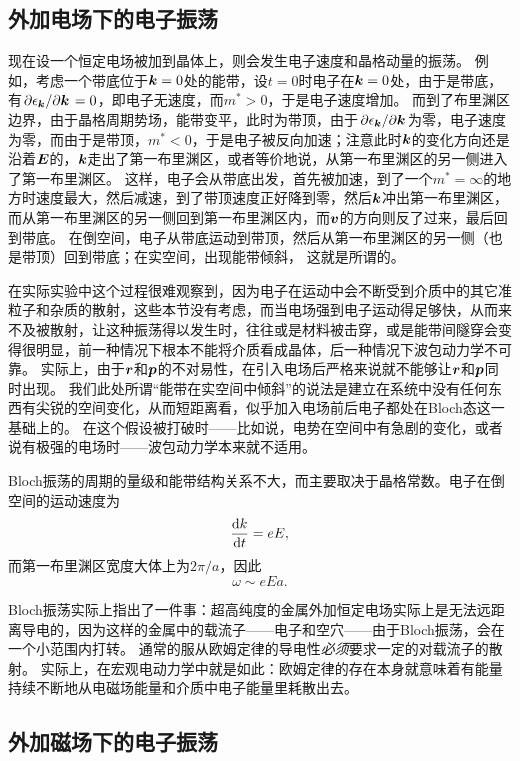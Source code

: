 \subsection{外加电场下的电子振荡}

现在设一个恒定电场被加到晶体上，则会发生电子速度和晶格动量的振荡。
例如，考虑一个带底位于$\vb*{k}=0$处的能带，设$t=0$时电子在$\vb*{k}=0$处，由于是带底，有$\pdv*{\epsilon_{\vb*{k}}}{\vb*{k}} = 0$，即电子无速度，而$m^* > 0$，于是电子速度增加。
而到了布里渊区边界，由于晶格周期势场，能带变平，此时为带顶，由于$\pdv*{\epsilon_{\vb*{k}}}{\vb*{k}}$为零，电子速度为零，而由于是带顶，$m^* < 0$，于是电子被反向加速；注意此时$\vb*{k}$的变化方向还是沿着$\vb*{E}$的，$\vb*{k}$走出了第一布里渊区，或者等价地说，从第一布里渊区的另一侧进入了第一布里渊区。
这样，电子会从带底出发，首先被加速，到了一个$m^* = \infty$的地方时速度最大，然后减速，到了带顶速度正好降到零，然后$\vb*{k}$冲出第一布里渊区，而从第一布里渊区的另一侧回到第一布里渊区内，而$\vb*{v}$的方向则反了过来，最后回到带底。
在倒空间，电子从带底运动到带顶，然后从第一布里渊区的另一侧（也是带顶）回到带底；在实空间，出现能带倾斜，%
这就是所谓的。

在实际实验中这个过程很难观察到，因为电子在运动中会不断受到介质中的其它准粒子和杂质的散射，这些本节没有考虑，而当电场强到电子运动得足够快，从而来不及被散射，让这种振荡得以发生时，往往或是材料被击穿，或是能带间隧穿会变得很明显，前一种情况下根本不能将介质看成晶体，后一种情况下波包动力学不可靠。
实际上，由于$\vb*{r}$和$\vb*{p}$的不对易性，在引入电场后严格来说就不能够让$\vb*{r}$和$\vb*{p}$同时出现。
我们此处所谓“能带在实空间中倾斜”的说法是建立在系统中没有任何东西有尖锐的空间变化，从而短距离看，似乎加入电场前后电子都处在Bloch态这一基础上的。
在这个假设被打破时——比如说，电势在空间中有急剧的变化，或者说有极强的电场时——波包动力学本来就不适用。

Bloch振荡的周期的量级和能带结构关系不大，而主要取决于晶格常数。电子在倒空间的运动速度为
\[
    \dv{k}{t} = e E,
\]
而第一布里渊区宽度大体上为$2 \pi / a$，因此
\begin{equation}
    \omega \sim e E a.
\end{equation}

Bloch振荡实际上指出了一件事：超高纯度的金属外加恒定电场实际上是无法远距离导电的，因为这样的金属中的载流子——电子和空穴——由于Bloch振荡，会在一个小范围内打转。
通常的服从欧姆定律的导电性\emph{必须}要求一定的对载流子的散射。
实际上，在宏观电动力学中就是如此：欧姆定律的存在本身就意味着有能量持续不断地从电磁场能量和介质中电子能量里耗散出去。

\subsection{外加磁场下的电子振荡}

